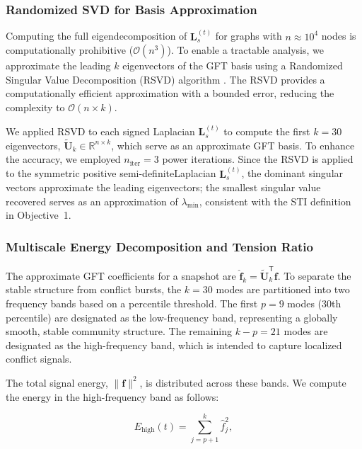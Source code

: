 \documentclass[a4paper,fleqn]{cas-dc}
\begin{document}
\subsubsection{Randomized SVD for Basis Approximation}
\label{subsec:rsvd_approximation}

Computing the full eigendecomposition of \( \mathbf{L}_s^{(t)} \) for graphs with \( n \approx 10^4 \) nodes is computationally prohibitive (\( \mathcal{O}(n^3) \)). To enable a tractable analysis, we approximate the leading \( k \) eigenvectors of the GFT basis using a Randomized Singular Value Decomposition (RSVD) algorithm \cite{25_Halko2011}. The RSVD provides a computationally efficient approximation with a bounded error, reducing the complexity to \( \mathcal{O}(n \times k) \).

We applied RSVD to each signed Laplacian \( \mathbf{L}_s^{(t)} \) to compute the first \( k = 30 \) eigenvectors, \( \tilde{\mathbf{U}}_k \in \mathbb{R}^{n \times k} \), which serve as an approximate GFT basis. To enhance the accuracy, we employed \( n_{\text{iter}} = 3 \) power iterations. Since the RSVD is applied to the symmetric positive semi-definiteLaplacian $\mathbf{L}_s^{(t)}$, the dominant singular vectors
approximate the leading eigenvectors; the smallest singular value
recovered serves as an approximation of $\lambda_{\min}$, consistent
with the STI definition in Objective~1.

\subsubsection{Multiscale Energy Decomposition and Tension Ratio}
\label{subsec:energy_decomposition}

The approximate GFT coefficients for a snapshot are \( \hat{\mathbf{f}}_k = \tilde{\mathbf{U}}_k^{\mathsf{T}} \mathbf{f} \). To separate the stable structure from conflict bursts, the \( k = 30 \) modes are partitioned into two frequency bands based on a percentile threshold. The first \( p = 9 \) modes (30th percentile) are designated as the low-frequency band, representing a globally smooth, stable community structure. The remaining \( k-p = 21 \) modes are designated as the high-frequency band, which is intended to capture localized conflict signals.

The total signal energy, \( \|\mathbf{f}\|^2 \), is distributed across these bands. We compute the energy in the high-frequency band as follows:

\begin{equation}
\label{eq:high_freq_energy}
E_{\text{high}}(t) = \sum_{j=p+1}^{k} \hat{f}_j^2,
\end{equation}
\end{document}
